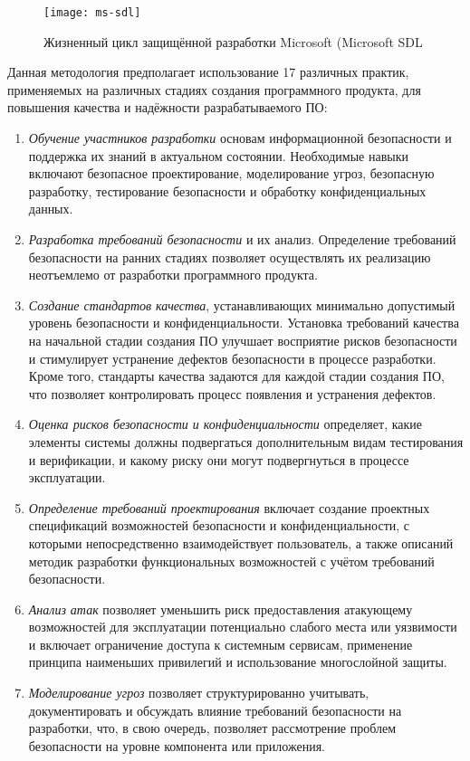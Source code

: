 \begin{figure}[h]
   \centering
   \texttt{[image: ms-sdl]}
   \caption{Жизненный цикл защищённой разработки Microsoft (Microsoft SDL}\label{pic:ms-sdl}
\end{figure}

Данная методология предполагает использование 17 различных практик, применяемых на различных стадиях создания программного продукта, для повышения качества и надёжности разрабатываемого ПО:

\begin{enumerate}
 \item \textit{Обучение участников разработки} основам информационной безопасности и поддержка их знаний в актуальном состоянии. Необходимые навыки включают безопасное проектирование, моделирование угроз, безопасную разработку, тестирование безопасности и обработку конфиденциальных данных.
 \item \textit{Разработка требований безопасности} и их анализ. Определение требований безопасности на ранних стадиях позволяет осуществлять их реализацию неотъемлемо от разработки программного продукта.
 \item \textit{Создание стандартов качества}, устанавливающих минимально допустимый уровень безопасности и конфиденциальности. Установка требований качества на начальной стадии создания ПО улучшает восприятие рисков безопасности и стимулирует устранение дефектов безопасности в процессе разработки. Кроме того, стандарты качества задаются для каждой стадии создания ПО, что позволяет контролировать процесс появления и устранения дефектов.
 \item \textit{Оценка рисков безопасности и конфиденциальности} определяет, какие элементы системы должны подвергаться дополнительным видам тестирования и верификации, и какому риску они могут подвергнуться в процессе эксплуатации.
 \item \textit{Определение требований проектирования} включает создание проектных спецификаций возможностей безопасности и конфиденциальности, с которыми непосредственно взаимодействует пользователь, а также описаний методик разработки функциональных возможностей с учётом требований безопасности.
 \item \textit{Анализ атак} позволяет уменьшить риск предоставления атакующему возможностей для эксплуатации потенциально слабого места или уязвимости и включает ограничение доступа к системным сервисам, применение принципа наименьших привилегий и использование многослойной защиты.
 \item \textit{Моделирование угроз} позволяет структурированно учитывать, документировать и обсуждать влияние требований безопасности на разработки, что, в свою очередь, позволяет рассмотрение проблем безопасности на уровне компонента или приложения.

\end{enumerate}

